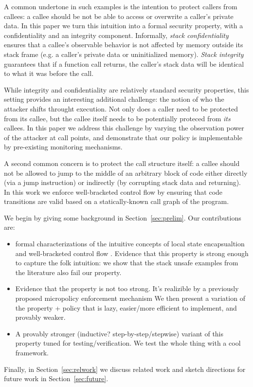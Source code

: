 \documentclass[acmsmall,review,anonymous]{acmart}\settopmatter{printfolios=true,printccs=false,printacmref=false}
\begin{document}
A common undertone in such examples is the intention to protect
callers from callees: a callee should be not be able to access or
overwrite a caller's private data. In this paper we turn this
intuition into a formal security property, with a confidentiality and
an integrity component.
%
Informally, {\em stack confidentiality} ensures that a callee's
observable behavior is not affected by memory outside its stack frame
(e.g. a caller's private data or uninitialized memory).  {\em Stack
  integrity} guarantees that if a function call returns, the caller's
stack data will be identical to what it was before the call.

While integrity and confidentiality are relatively standard security
properties, this setting provides an interesting additional challenge:
the notion of who the attacker shifts throught execution. Not only
does a caller need to be protected from its callee, but the callee
itself needs to be potentially proteced from {\em its} callees.  In
this paper we address this challenge by varying the observation power
of the attacker at call points, and demonstrate that our policy is
implementable by pre-existing monitoring mechanisms.

%
A second common concern is to protect the call structure itself: a
callee should not be allowed to jump to the middle of an arbitrary
block of code either directly (via a jump instruction) or indirectly
(by corrupting stack data and returning). In this work we enforce
well-bracketed control flow by ensuring that code transitions are
valid based on a statically-known call graph of the
program. 

We begin by giving some background in Section~\ref{sec:prelim}.
Our contributions are:
\begin{itemize}
\item {} formal characterizations of the intuitive concepts
  of local state encapsualtion  and well-bracketed control flow .
  Evidence that this property is strong enough to capture the folk
  intuition: we show that the stack unsafe examples from the literature also fail
  our property.
\item Evidence that the property is not too strong. It's realizible by
  a previously proposed  micropolicy enforcement mechanism 
  We then present a variation of the property + policy that is lazy,
  easier/more efficient to implement, and provably weaker.
\item A provably stronger (inductive? step-by-step/stepwise) variant
  of this property tuned for testing/verification.  We test the whole
  thing with a cool framework.
\end{itemize}
Finally, in Section~\ref{sec:relwork} we discuss related work and
sketch directions for future work in Section~\ref{sec:future}.
\end{document}
